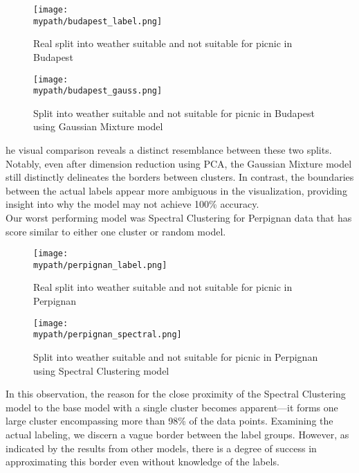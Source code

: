 \documentclass[a4paper]{article}
\begin{document}
	\begin{figure}[h!]
		\centerline{\texttt{[image: \\mypath/budapest\_label.png]}}
		\caption{Real split into weather suitable and not suitable for picnic in Budapest}
	\end{figure}
	
	\begin{figure}[h!]
		\centerline{\texttt{[image: \\mypath/budapest\_gauss.png]}}
		\caption{Split into weather suitable and not suitable for picnic in Budapest using Gaussian Mixture model}
	\end{figure}

	he visual comparison reveals a distinct resemblance between these two splits. Notably, even after dimension reduction using PCA, the Gaussian Mixture model still distinctly delineates the borders between clusters. In contrast, the boundaries between the actual labels appear more ambiguous in the visualization, providing insight into why the model may not achieve 100\% accuracy.
	\\
	\newpage
	Our worst performing model was Spectral Clustering for Perpignan data that has score similar to either one cluster or random model.
	
	\begin{figure}[h!]
		\centerline{\texttt{[image: \\mypath/perpignan\_label.png]}}
		\caption{Real split into weather suitable and not suitable for picnic in Perpignan}
	\end{figure}
	
	\begin{figure}[h!]
		\centerline{\texttt{[image: \\mypath/perpignan\_spectral.png]}}
		\caption{Split into weather suitable and not suitable for picnic in Perpignan using Spectral Clustering model}
	\end{figure}
	
	In this observation, the reason for the close proximity of the Spectral Clustering model to the base model with a single cluster becomes apparent—it forms one large cluster encompassing more than 98\% of the data points. Examining the actual labeling, we discern a vague border between the label groups. However, as indicated by the results from other models, there is a degree of success in approximating this border even without knowledge of the labels.
	
\end{document}
